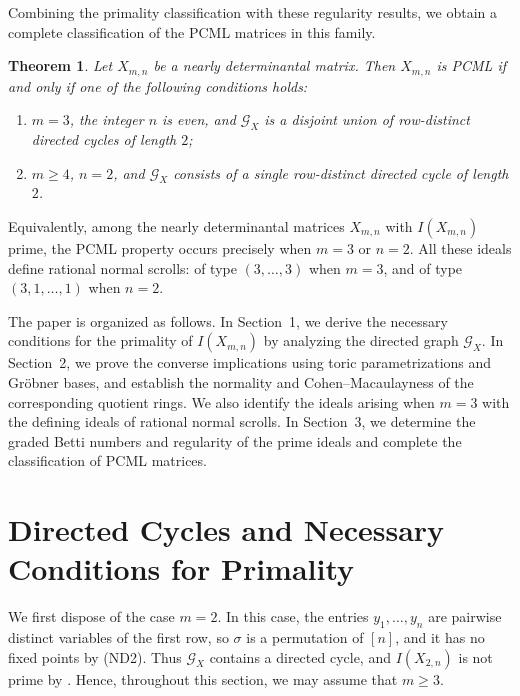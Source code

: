 \documentclass[12pt]{amsart}
\numberwithin{equation}{section}
\newtheorem{Theorem}{Theorem}[section]
\begin{document}
Combining the primality classification with these regularity results,
we obtain a complete classification of the PCML matrices in this
family.

\begin{Theorem}\label{thm:PCML-classification}
Let $X_{m,n}$ be a nearly determinantal matrix. Then $X_{m,n}$ is
PCML if and only if one of the following conditions holds:
\begin{enumerate}
    \item[{\em (i)}] $m=3$, the integer $n$ is even, and $\mathcal G_X$ is a
    disjoint union of row-distinct directed cycles of length $2$;
    \item[{\em (ii)}] $m\geq4$, $n=2$, and $\mathcal G_X$ consists of a single
    row-distinct directed cycle of length $2$.
\end{enumerate}
\end{Theorem}

Equivalently, among the nearly determinantal matrices $X_{m,n}$ with $I(X_{m,n})$ prime, the PCML property occurs precisely when $m=3$ or $n=2$. All these ideals define rational normal scrolls: of type $(3,\ldots,3)$ when $m=3$, and of type $(3,1,\ldots,1)$ when $n=2$.

The paper is organized as follows. In Section~1, we
derive the necessary conditions for the primality of
$I(X_{m,n})$ by analyzing the directed graph $\mathcal G_X$.
In Section~2, we prove the converse implications
using toric parametrizations and Gr\"obner bases,
and establish the normality and Cohen--Macaulayness
of the corresponding quotient rings. We also identify
the ideals arising when $m=3$ with the defining ideals
of rational normal scrolls. In Section~3, we determine
the graded Betti numbers and regularity of the prime
ideals and complete the classification of PCML matrices.


\section{Directed Cycles and Necessary Conditions for Primality}

We first dispose of the case $m=2$. In this case, the entries $y_1,\ldots,y_n$ are pairwise distinct variables of the first row, so $\sigma$ is a permutation of $[n]$, and it has no fixed points by (ND2). Thus $\mathcal G_X$ contains a directed cycle, and $I(X_{2,n})$ is not prime by \cite[Theorem~2.6]{HQ}. Hence, throughout this section, we may assume that $m\geq 3$.
\end{document}

